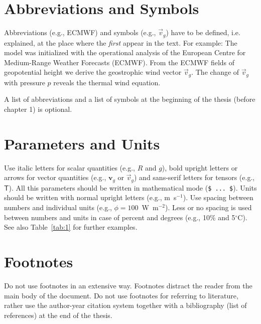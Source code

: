 \section{Abbreviations and Symbols}
Abbreviations (e.g., ECMWF) and symbols (e.g., $\vec{v}_g$) have to be
defined, i.e. explained, at the place where the \emph{first} appear in the text.
For example: The model was initialized with the operational analysis of the
European Centre for Medium-Range Weather Forecasts (ECMWF). From the ECMWF
fields of geopotential height we derive the geostrophic wind vector
$\vec{v}_g$. The change of $\vec{v}_g$ with pressure $p$ reveals the thermal
wind equation.

A list of abbreviations and a list of symbols at the beginning of the thesis
(before chapter 1) is optional.


\section{Parameters and Units}

Use italic letters for scalar quantities (e.g., $R$ and $g$), bold upright
letters or arrows for vector quantities (e.g., $\mathbf{v}_g$ or $\vec{v}_g$)
and sans-serif letters for tensors (e.g., $\mathsf{T}$). All this parameters
should be written in mathematical mode (\verb|$ ... $|). Units should be
written with normal upright letters (e.g., m~s$^{-1}$). Use spacing between
numbers and individual units (e.g., $\phi=100$~W~m$^{-2}$). Less or no spacing
is used between numbers and units in case of percent and degrees (e.g.,
10\% and 5$^{\circ}$C). See also Table~\ref{tab:1} for further examples.


\section{Footnotes}
Do not use footnotes in an extensive way. Footnotes distract the reader from the
main body of the document. Do not use footnotes for referring to literature,
rather use the author-year citation system together with a bibliography (list
of references) at the end of the thesis.

